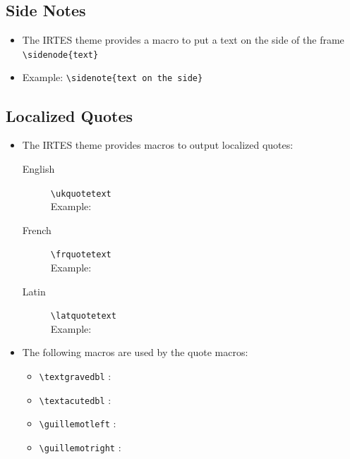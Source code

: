 \documentclass[english,circlenumberstyle]{irtesbeamer}
\begin{document}
\subsection{Side Notes}
\begin{frame}{\subsecname}
	\begin{itemize}
	\item The IRTES theme provides a macro to put a text on the side of the frame \\
		\texttt{{\textbackslash}sidenode\{text\}}
	\item Example: \texttt{{\textbackslash}sidenote\{text on the side\}}
	\end{itemize}
\end{frame}

\subsection{Localized Quotes}
\begin{frame}{\subsecname}
	\begin{itemize}
	\item The IRTES theme provides macros to output localized quotes:
		\begin{description}
		\item[English] \texttt{{\textbackslash}ukquote{text}} \\
			Example: 
		\item[French] \texttt{{\textbackslash}frquote{text}} \\
			Example: 
		\item[Latin] \texttt{{\textbackslash}latquote{text}} \\
			Example: 
		\end{description}
	\item The following macros are used by the quote macros:
		\begin{itemize}
		\item \texttt{{\textbackslash}textgravedbl} : \textgravedbl
		\item \texttt{{\textbackslash}textacutedbl} : \textacutedbl
		\item \texttt{{\textbackslash}guillemotleft} : \guillemotleft
		\item \texttt{{\textbackslash}guillemotright} : \guillemotright
		\end{itemize}
	\end{itemize}
\end{frame}
\end{document}
